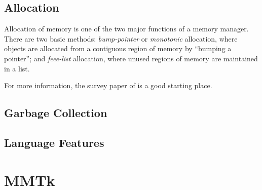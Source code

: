 \subsection{Allocation}

Allocation of memory is one of the two major functions of a memory manager.  There are
two basic methods: \emph{bump-pointer} or \emph{monotonic} allocation, where objects
are allocated from a contiguous region of memory by ``bumping a pointer''; and 
\emph{feee-list} allocation, where unused regions of memory are maintained in
a list.

For more information, the survey paper of \citet{WJNB:95} is a good starting place.

\subsection{Garbage Collection}


\subsection{Language Features}
%
\section{MMTk}

%
% 

